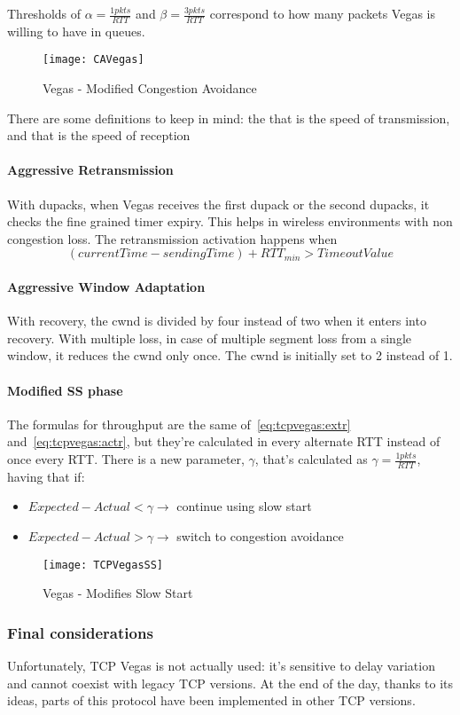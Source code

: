 Thresholds of $\alpha = \frac{1 pkts}{RTT}$ and
$\beta = \frac{3 pkts}{RTT}$ correspond to how many packets Vegas is willing
to have in queues.
\begin{figure}[t]
  \centering
  \texttt{[image: CAVegas]}
  \caption{Vegas - Modified Congestion Avoidance}
  \label{fig:tcpVegas:mca}
\end{figure}

There are some definitions to keep in mind: the  that is
the speed of transmission, and  that is the speed of reception

\paragraph*{Aggressive Retransmission} With dupacks, when Vegas receives the
first dupack or the second dupacks, it checks the fine grained timer expiry.
This helps in wireless environments with non congestion loss.
The retransmission activation happens when
\begin{equation*}
(currentTime - sendingTime) + RTT_{min} > TimeoutValue
\end{equation*}

\paragraph*{Aggressive Window Adaptation} With recovery, the cwnd is divided by
four instead of two when it enters into recovery. With multiple loss, in case of
multiple segment loss from a single window, it reduces the cwnd only once. The
cwnd is initially set to 2 instead of 1.

\paragraph*{Modified SS phase} The formulas for throughput are the same
of~\ref{eq:tcpvegas:extr} and~\ref{eq:tcpvegas:actr}, but they're calculated in
every alternate RTT instead of once every RTT. There is a new parameter,
$\gamma$, that's calculated as $\gamma = \frac{1pkts}{RTT}$, having that if:
\begin{itemize}
\item $Expected - Actual < \gamma \to$ continue using slow start
\item $Expected - Actual > \gamma \to$ switch to congestion avoidance
\end{itemize}

\begin{figure}[h]
  \centering
  \texttt{[image: TCPVegasSS]}
  \caption{Vegas - Modifies Slow Start}
  \label{fig:tcpvegas:ss}
\end{figure}

\subsubsection{Final considerations}

Unfortunately, TCP Vegas is not actually used: it's sensitive to delay variation
and cannot coexist with legacy TCP versions. At the end of the day, thanks to
its ideas, parts of this protocol have been implemented in other TCP versions.
